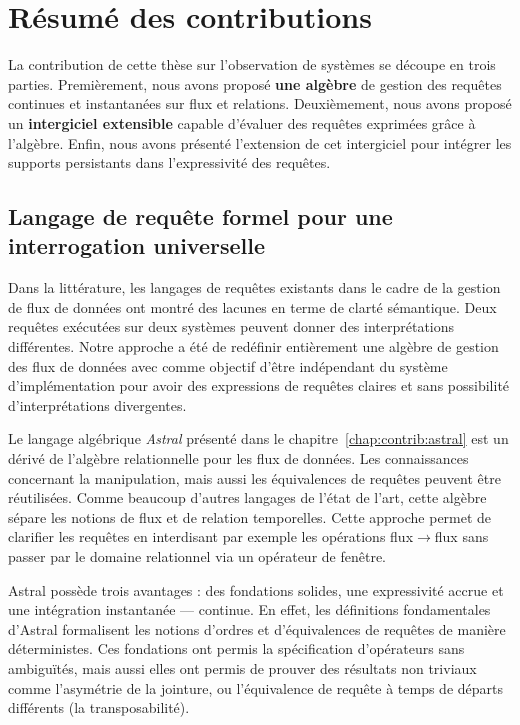 \section{Résumé des contributions}\label{sec:conclusion:contributions}
La contribution de cette thèse sur l'observation de systèmes se découpe en trois parties. Premièrement, nous avons proposé \textbf{une algèbre} de gestion des requêtes continues et instantanées sur flux et relations. Deuxièmement, nous avons proposé un \textbf{intergiciel extensible} capable d'évaluer des requêtes exprimées grâce à l'algèbre. Enfin, nous avons présenté l'extension de cet intergiciel pour intégrer les supports persistants dans l'expressivité des requêtes.

\subsection{Langage de requête formel pour une interrogation universelle}
Dans la littérature, les langages de requêtes existants dans le cadre de la gestion de flux de données ont montré des lacunes en terme de clarté sémantique. Deux requêtes exécutées sur deux systèmes peuvent donner des interprétations différentes. Notre approche a été de redéfinir entièrement une algèbre de gestion des flux de données avec comme objectif d'être indépendant du système d'implémentation pour avoir des expressions de requêtes claires et sans possibilité d'interprétations divergentes.

Le langage algébrique \textit{Astral} présenté dans le chapitre~\ref{chap:contrib:astral} est un dérivé de l'algèbre relationnelle pour les flux de données. Les connaissances concernant la manipulation, mais aussi les équivalences de requêtes peuvent être réutilisées. Comme beaucoup d'autres langages de l'état de l'art, cette algèbre sépare les notions de flux et de relation temporelles. Cette approche permet de clarifier les requêtes en interdisant par exemple les opérations flux$\to$flux sans passer par le domaine relationnel via un opérateur de fenêtre.

Astral possède trois avantages : des fondations solides, une expressivité accrue et une intégration instantanée — continue. En effet, les définitions fondamentales d'Astral formalisent les notions d'ordres et d'équivalences de requêtes de manière déterministes. Ces fondations ont permis la spécification d'opérateurs sans ambiguïtés, mais aussi elles ont permis de prouver des résultats non triviaux comme l'asymétrie de la jointure, ou l'équivalence de requête à temps de départs différents (la transposabilité).

